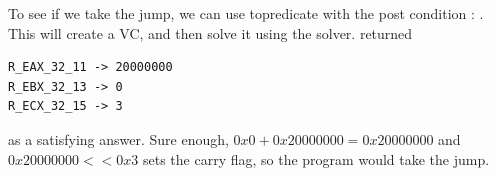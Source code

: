 \begin{centering}
\begin{scriptsize}

\end{scriptsize}
\end{centering}

To see if we take the jump, we can use topredicate with the post
condition : .  This will create a VC, and then
solve it using the  solver.   returned
\begin{verbatim}
R_EAX_32_11 -> 20000000
R_EBX_32_13 -> 0
R_ECX_32_15 -> 3
\end{verbatim}
as a satisfying answer. Sure enough, $0x0 + 0x20000000 = 0x20000000$
and $0x20000000 << 0x3$ sets the carry flag, so the program would take
the jump.

